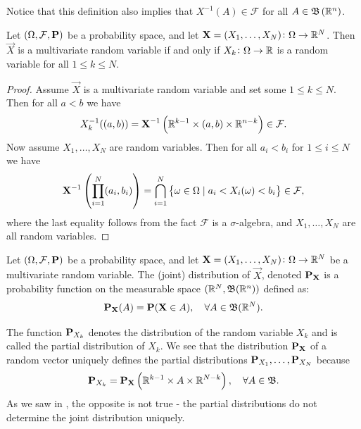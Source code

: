 \documentclass[11pt,a4paper]{article}
\begin{document}
\begin{remark}
Notice that this definition also implies that $X^{-1}(A) \in \mathcal F$
for all $A \in \mathfrak B\left(\mathbb{R}^n\right)$.
\end{remark}

\begin{proposition}
  Let $(\Omega, \mathcal F, \mathbf{P})$ be a probability space, 
  and let $\boldsymbol{\mathbf{X}} = (X_1,\dots,X_N) \colon \Omega \to \mathbb{R}^N$. 
  Then $\vec{X}$ is a multivariate random variable if and only if 
  $X_k \colon \Omega \to \mathbb{R}$ is a random variable for all $1 \le k \le N$.
\end{proposition}
\begin{proof}
  Assume $\vec{X}$ is a multivariate random variable and set some $1 \le k \le N$.
  Then for all $a < b$ we have
  \[
    X_k^{-1}((a,b)) = 
    \boldsymbol{\mathbf{X}}^{-1}\left(\mathbb{R}^{k-1} \times (a,b) \times \mathbb{R}^{n-k}\right) \in
    \mathcal F.
  \]
  Now assume $X_1,\dots,X_N$ are random variables. Then for all $a_i < b_i$
  for $1 \le i \le N$ we have
  \[
    \boldsymbol{\mathbf{X}}^{-1}\left(\prod_{i=1}^{N} (a_i, b_i)\right) =
    \bigcap_{i=1}^{N}\left\{\omega \in \Omega \mid a_i < X_i(\omega) < b_i\right\} \in
    \mathcal F,
  \]
  where the last equality follows from the fact $\mathcal F$ is
  a $\sigma$-algebra, and $X_1,\dots,X_N$ are all random variables.
\end{proof}

\begin{definition}
  Let $(\Omega, \mathcal F, \mathbf{P})$ be a probability space, 
  and let $\boldsymbol{\mathbf{X}} = (X_1,\dots,X_N) \colon \Omega \to \mathbb{R}^N$ be a multivariate
  random variable.
  The (joint) distribution of $\vec{X}$, denoted $\mathbf{P}_{\boldsymbol{\mathbf{X}}}$ is a probability function
  on the measurable space $(\mathbb{R}^N, \mathfrak B(\mathbb{R}^n))$ defined as:
  \[
    \mathbf{P}_{\boldsymbol{\mathbf{X}}}(A) =
    \mathbf{P}(\boldsymbol{\mathbf{X}} \in A), \quad
    \forall A \in \mathfrak B(\mathbb{R}^N).
  \]
\end{definition}

\begin{remark}
  The function $\mathbf{P}_{X_k}$ denotes the distribution of the random
  variable $X_k$ and is called the partial distribution of $X_k$.
  We see that the distribution $\mathbf{P}_{\boldsymbol{\mathbf{X}}}$ of a random vector uniquely
  defines the partial distributions $\mathbf{P}_{X_1},\dots,\mathbf{P}_{X_N}$
  because
  \[
    \mathbf{P}_{X_k} =
    \mathbf{P}_{\boldsymbol{\mathbf{X}}}\left(\mathbb{R}^{k-1} \times A \times \mathbb{R}^{N-k}\right),
    \quad \forall A \in \mathfrak B.
  \]
  As we saw in ,
  the opposite is not true -
  the partial distributions do not determine the joint distribution
  uniquely.
\end{remark}
\end{document}

